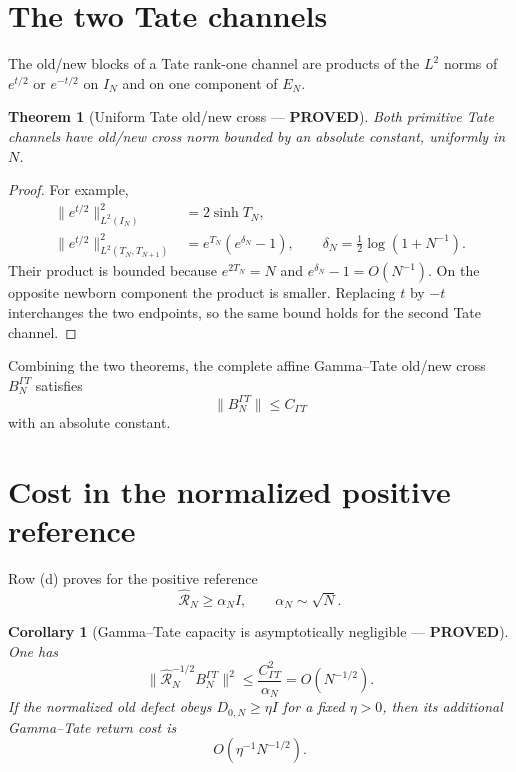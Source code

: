 \documentclass[11pt]{article}
\newcommand{\PROVED}{\textcolor{green!40!black}{\textbf{PROVED}}}
\newtheorem{theorem}{Theorem}
\newtheorem{corollary}{Corollary}
\begin{document}
\section{The two Tate channels}

The old/new blocks of a Tate rank-one channel are products of the
$L^2$ norms of $e^{t/2}$ or $e^{-t/2}$ on $I_N$ and on one component of
$E_N$.

\begin{theorem}[Uniform Tate old/new cross --- \PROVED]
Both primitive Tate channels have old/new cross norm bounded by an absolute
constant, uniformly in $N$.
\end{theorem}

\begin{proof}
For example,
\begin{align*}
 \|e^{t/2}\|_{L^2(I_N)}^2&=2\sinh T_N,\\
 \|e^{t/2}\|_{L^2(T_N,T_{N+1})}^2
 &=e^{T_N}(e^{\delta_N}-1),
 \qquad \delta_N=\frac12\log(1+N^{-1}).
\end{align*}
Their product is bounded because $e^{2T_N}=N$ and
$e^{\delta_N}-1=O(N^{-1})$.  On the opposite newborn component the
product is smaller.  Replacing $t$ by $-t$ interchanges the two endpoints,
so the same bound holds for the second Tate channel.
\end{proof}

Combining the two theorems, the complete affine Gamma--Tate old/new cross
$B_N^{\Gamma T}$ satisfies
\begin{equation}
                         \|B_N^{\Gamma T}\|\le C_{\Gamma T}   \tag{3}
\end{equation}
with an absolute constant.

\section{Cost in the normalized positive reference}

Row (d) proves for the positive reference
\begin{equation}
 \widehat{\mathcal R}_N\ge\alpha_N I,
 \qquad \alpha_N\sim\sqrt N.                                 \tag{4}
\end{equation}

\begin{corollary}[Gamma--Tate capacity is asymptotically negligible ---
\PROVED]
One has
\begin{equation}
 \bigl\|\widehat{\mathcal R}_N^{-1/2}B_N^{\Gamma T}\bigr\|^2
 \le\frac{C_{\Gamma T}^2}{\alpha_N}=O(N^{-1/2}).              \tag{5}
\end{equation}
If the normalized old defect obeys $D_{0,N}\ge\eta I$ for a fixed
$\eta>0$, then its additional Gamma--Tate return cost is
\begin{equation}
                         O(\eta^{-1}N^{-1/2}).                 \tag{6}
\end{equation}
\end{corollary}
\end{document}
